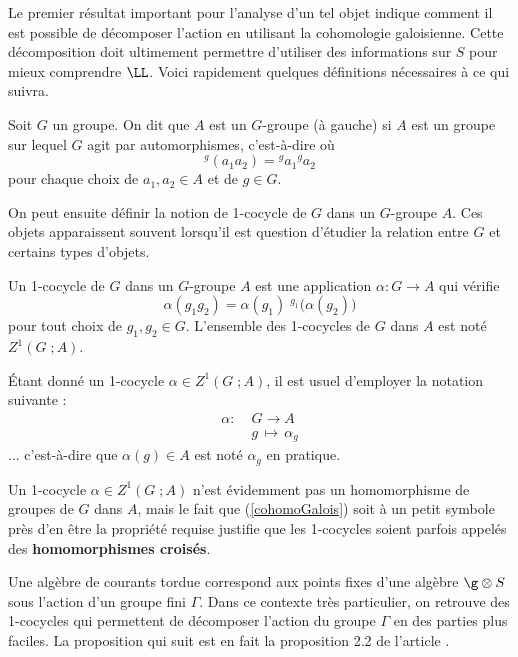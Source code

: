 Le premier résultat important pour l'analyse d'un tel objet indique comment il est possible de décomposer l'action en utilisant la cohomologie galoisienne. Cette décomposition doit ultimement permettre d'utiliser des informations sur $S$ pour mieux comprendre $\LL$. Voici rapidement quelques définitions nécessaires à ce qui suivra.

\begin{Def} Soit $G$ un groupe. On dit que $A$ est un $G$-groupe (à gauche) si $A$ est un groupe sur lequel $G$ agit par automorphismes, c'est-à-dire où
$$ {}^g(a_1a_2) = {}^g a_1{}^g a_2 $$
pour chaque choix de $a_1,a_2 \in A$ et de $g \in G$.
\end{Def}

On peut ensuite définir la notion de 1-cocycle de $G$ dans un $G$-groupe $A$. Ces objets apparaissent souvent lorsqu'il est question d'étudier la relation entre $G$ et certains types d'objets.

\begin{Def} Un 1-cocycle de $G$ dans un $G$-groupe $A$ est une application $ \alpha : G \rightarrow A $ qui vérifie 
\begin{equation} \label{cohomoGalois}
\alpha(g_1g_2) = \alpha(g_1)\;{}^{g_1}\big(\alpha(g_2)\big)
\end{equation} 
pour tout choix de $g_1,g_2 \in G$. L'ensemble des 1-cocycles de $G$ dans $A$ est noté $Z^1(G \; ; A)$. 

Étant donné un 1-cocycle $\alpha \in Z^1(G \; ; A)$, il est usuel d'employer la notation suivante :
\begin{align*}
\alpha : \; &G \longrightarrow A \\
&g \, \longmapsto \, \alpha_g
\end{align*}
... c'est-à-dire que $\alpha(g) \in A$ est noté $\alpha_g$ en pratique.
\end{Def}

\begin{Rem} Un 1-cocycle $\alpha \in Z^1(G \; ; A)$ n'est évidemment pas un homomorphisme de groupes de $G$ dans $A$, mais le fait que (\ref{cohomoGalois}) soit à un petit symbole près d'en être la propriété requise justifie que les 1-cocycles soient parfois appelés des \textbf{homomorphismes croisés}.
\end{Rem}

Une algèbre de courants tordue correspond aux points fixes d'une algèbre $\g \otimes S$ sous l'action d'un groupe fini $\Gamma$. Dans ce contexte très particulier, on retrouve des 1-cocycles qui permettent de décomposer l'action du groupe $\Gamma$ en des parties plus faciles. La proposition qui suit est en fait la proposition 2.2 de l'article \cite{LauTCA}.

